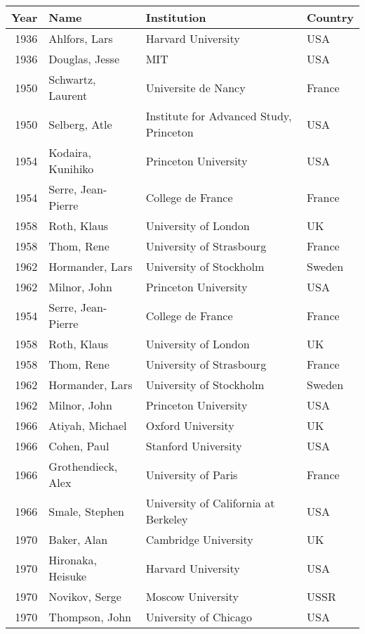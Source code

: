 \begin{tabular}{|r|l|l|l|} \hline

{Year} & {Name} & {Institution} &{Country}\\
\hline

1936&Ahlfors, Lars       &Harvard University         &USA \\
1936&Douglas, Jesse      &MIT                        &USA \\
1950&Schwartz, Laurent   &Universite de Nancy        &France \\
1950&Selberg, Atle       &Institute for Advanced Study, Princeton&USA \\
1954&Kodaira, Kunihiko   &Princeton University       &USA \\
1954&Serre, Jean-Pierre  &College de France          &France \\
1958&Roth, Klaus         &University of London       &UK \\
1958&Thom, Rene          &University of Strasbourg   &France \\
1962&Hormander, Lars     &University of Stockholm    &Sweden \\
1962&Milnor, John        &Princeton University       &USA \\
1954&Serre, Jean-Pierre  &College de France          &France \\
1958&Roth, Klaus         &University of London       &UK \\
1958&Thom, Rene          &University of Strasbourg   &France \\
1962&Hormander, Lars     &University of Stockholm    &Sweden \\
1962&Milnor, John        &Princeton University       &USA \\
1966&Atiyah, Michael     &Oxford University          &UK \\
1966&Cohen, Paul         &Stanford University        &USA \\
1966&Grothendieck, Alex  &University of Paris        &France \\
1966&Smale, Stephen      &University of California at Berkeley&USA \\
1970&Baker, Alan         &Cambridge University       &UK \\
1970&Hironaka, Heisuke   &Harvard University         &USA \\
1970&Novikov, Serge      &Moscow University          &USSR \\
1970&Thompson, John      &University of Chicago      &USA \\

\end{tabular}
